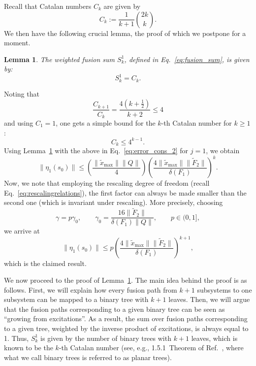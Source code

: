 \documentclass[superscriptaddress,onecolumn,nofootinbib,longbibliography,a4paper,accepted=2026-09-29]{quantumarticle}
\theoremstyle{plain}
\newtheorem{lemma}[thm]{Lemma}
\theoremstyle{definition}
\numberwithin{thm}{section}
\numberwithin{assumption}{section}
\numberwithin{lemma}{section}
\numberwithin{prop}{section}
\numberwithin{cor}{section}
\numberwithin{definition}{section}
\numberwithin{rmk}{section}
\numberwithin{equation}{section}
\begin{document}
Recall that Catalan numbers $C_k$ are given by
\begin{equation}
    C_k := \frac{1}{k+1} \binom{2k}{k}.
\end{equation}
We then have the following crucial lemma, the proof of which we postpone for a moment.
\begin{lemma}
    \label{lem:fusion_sums}
    The weighted fusion sum $S_k^{1}$, defined in Eq.~\eqref{eq:fusion_sum}, is given by:
    \begin{equation}
        S_k^{1} = C_k.
    \end{equation}
\end{lemma}
Noting that
\begin{equation}
    \frac{C_{k+1}}{C_k}=\frac{4(k+\frac{1}{2})}{k+2} \leq 4
\end{equation}
and using $C_1=1$, one gets a simple bound for the $k$-th Catalan number for $k\geq 1$:
\begin{equation}
    C_k\leq 4^{k-1}.
\end{equation}
Using Lemma~\ref{lem:fusion_sums} with the above in Eq.~\eqref{eq:error_cons_2} for $j=1$, we obtain
\begin{equation}
    \label{eq:error_cons_3}
    \|\eta_1(s_0)\| \leq  \left(\frac{\|\tilde{x}_{\mathrm{max}}\| \|Q\|}{4}\right) \left(\frac{4\|\tilde{x}_{\mathrm{max}}\| \|\tilde{F}_2\|}{\delta(F_1)} \right)^k.
\end{equation}
Now, we note that employing the rescaling degree of freedom (recall Eq.~\eqref{eq:rescalingrelations}), the first factor can always be made smaller than the second one (which is invariant under rescaling). More precisely, choosing 
\begin{equation}
    \gamma = p \gamma_0,\qquad \gamma_0=\frac{16\|\tilde{F}_2\|}{\delta(F_1)\|Q\|},\qquad p\in(0,1],
\end{equation}
we arrive at
\begin{equation}
    \|\eta_1(s_0)\| \leq  p \left(\frac{4\|\tilde{x}_{\mathrm{max}}\| \|\tilde{F}_2\|}{\delta(F_1)} \right)^{k+1},
\end{equation}
which is the claimed result.

We now proceed to the proof of Lemma~\ref{lem:fusion_sums}. The main idea behind the proof is as follows. First, we will explain how every fusion path from $k+1$ subsystems to one subsystem can be mapped to a binary tree with $k+1$ leaves. Then, we will argue that the fusion paths corresponding to a given binary tree can be seen as ``growing from excitations''. As a result, the sum over fusion paths corresponding to a given tree, weighted by the inverse product of excitations, is always equal to 1. Thus, $S^{1}_k$ is given by the number of binary trees with $k+1$ leaves, which is known to be the $k$-th Catalan number (see, e.g., 1.5.1~Theorem of Ref.~\cite{stanley2015catalan}, where what we call binary trees is referred to as planar trees).
\end{document}
